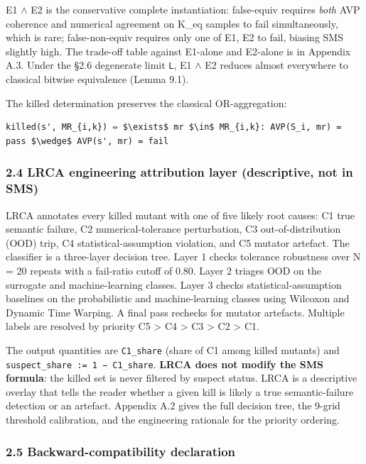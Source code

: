 \documentclass[review,12pt,authoryear]{elsarticle}
\begin{document}
E1 $\wedge$ E2 is the conservative complete instantiation: false-equiv requires
\emph{both} AVP coherence and numerical agreement on K\_eq samples to
fail simultaneously, which is rare; false-non-equiv requires only one of
E1, E2 to fail, biasing SMS slightly high. The trade-off table against
E1-alone and E2-alone is in Appendix A.3. Under the §2.6 degenerate
limit \texttt{L}, E1 $\wedge$ E2 reduces almost everywhere to classical bitwise
equivalence (Lemma 9.1).

The killed determination preserves the classical OR-aggregation:

\begin{verbatim}
killed(s', MR_{i,k}) ⇔ $\exists$ mr $\in$ MR_{i,k}: AVP(S_i, mr) = pass $\wedge$ AVP(s', mr) = fail
\end{verbatim}

\subsubsection{2.4 LRCA engineering attribution layer (descriptive, not
in
SMS)}\label{lrca-engineering-attribution-layer-descriptive-not-in-sms}

LRCA annotates every killed mutant with one of five likely root causes:
C1 true semantic failure, C2 numerical-tolerance perturbation, C3
out-of-distribution (OOD) trip, C4 statistical-assumption violation, and
C5 mutator artefact. The classifier is a three-layer decision tree.
Layer 1 checks tolerance robustness over N = 20 repeats with a
fail-ratio cutoff of 0.80. Layer 2 triages OOD on the surrogate and
machine-learning classes. Layer 3 checks statistical-assumption
baselines on the probabilistic and machine-learning classes using
Wilcoxon and Dynamic Time Warping. A final pass rechecks for mutator
artefacts. Multiple labels are resolved by priority C5 \textgreater{} C4
\textgreater{} C3 \textgreater{} C2 \textgreater{} C1.

The output quantities are \texttt{C1\_share} (share of C1 among killed
mutants) and \texttt{suspect\_share\ :=\ 1\ −\ C1\_share}. \textbf{LRCA
does not modify the SMS formula}: the killed set is never filtered by
suspect status. LRCA is a descriptive overlay that tells the reader
whether a given kill is likely a true semantic-failure detection or an
artefact. Appendix A.2 gives the full decision tree, the 9-grid
threshold calibration, and the engineering rationale for the priority
ordering.

\subsubsection{2.5 Backward-compatibility
declaration}\label{backward-compatibility-declaration}
\end{document}
